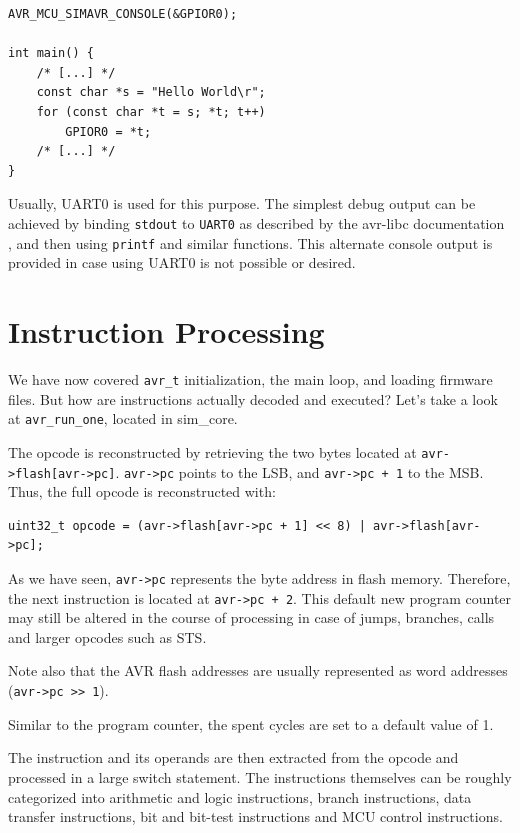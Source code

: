\begin{lstlisting}
AVR_MCU_SIMAVR_CONSOLE(&GPIOR0);

int main() {
    /* [...] */
    const char *s = "Hello World\r";
    for (const char *t = s; *t; t++)
        GPIOR0 = *t;
    /* [...] */
}
\end{lstlisting}

Usually, UART0 is used for this purpose. The simplest debug output can be achieved
by binding \lstinline|stdout| to \lstinline|UART0| as described by the avr-libc
documentation \cite{libc}, and then using \lstinline|printf| and similar functions.
This alternate console output is provided in case using UART0 is not possible or desired.



\section{Instruction Processing}

We have now covered \lstinline|avr_t| initialization, the main loop, and loading
firmware files. But how are instructions actually decoded and executed? Let's
take a look at \lstinline|avr_run_one|, located in sim\_core.

The opcode is reconstructed by retrieving the two bytes located at
\lstinline|avr->flash[avr->pc]|. \lstinline|avr->pc| points to the \ac{LSB}, and
\lstinline|avr->pc + 1| to the \ac{MSB}. Thus, the full opcode is reconstructed with:

\begin{lstlisting}
uint32_t opcode = (avr->flash[avr->pc + 1] << 8) | avr->flash[avr->pc];
\end{lstlisting}

As we have seen, \lstinline|avr->pc| represents the byte address in flash memory.
Therefore, the next instruction is located at \lstinline|avr->pc + 2|. This
default new program counter may still be altered in the course of processing
in case of jumps, branches, calls and larger opcodes such as STS\cite{instructionset}.

Note also that the \ac{AVR} flash addresses are usually represented as word addresses
(\lstinline|avr->pc >> 1|).

Similar to the program counter, the spent cycles are set to a default value of 1.

The instruction and its operands are then extracted from the opcode and processed
in a large switch statement. The instructions themselves can be roughly categorized
into arithmetic and logic instructions, branch instructions, data transfer
instructions, bit and bit-test instructions and \ac{MCU} control instructions.

